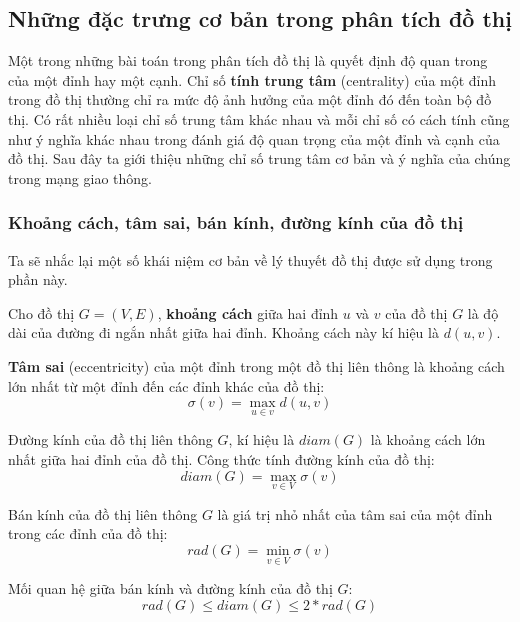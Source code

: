 \documentclass[14pt, oneside, a4paper, openany]{scrartcl}
\begin{document}
\subsection{Những đặc trưng cơ bản trong phân tích đồ thị}
Một trong những bài toán trong phân tích đồ thị là quyết định độ quan trong của một đỉnh hay một cạnh. Chỉ số \textbf{tính trung tâm}  (centrality) của một đỉnh trong đồ thị thường chỉ ra mức độ ảnh hưởng của một đỉnh đó đến toàn bộ đồ thị. Có rất nhiều loại chỉ số trung tâm khác nhau và mỗi chỉ số có cách tính cũng như ý nghĩa khác nhau trong đánh giá độ quan trọng của một đỉnh và cạnh của đồ thị. Sau đây ta giới thiệu những chỉ số trung tâm cơ bản và ý nghĩa của chúng trong mạng giao thông.

\subsubsection{Khoảng cách, tâm sai, bán kính, đường kính của đồ thị}
Ta sẽ nhắc lại một số khái niệm cơ bản về lý thuyết đồ thị được sử dụng trong phần này.

\cite{graphtextbook} Cho đồ thị $G=(V,E)$, \textbf{khoảng cách}  giữa hai đỉnh $u$ và $v$ của đồ thị $G$ là độ dài của đường đi ngắn nhất giữa hai đỉnh. Khoảng cách này kí hiệu là $d(u,v)$.

\cite{graphtextbook} \textbf{Tâm sai}  (eccentricity) của một đỉnh trong một đồ thị liên thông là khoảng cách lớn nhất từ một đỉnh đến các đỉnh khác của đồ thị:
\begin{equation}
	\sigma(v) = \max_{u \in v} d(u,v)
\end{equation}

\cite{graphtextbook} Đường kính của đồ thị liên thông $G$, kí hiệu là $diam(G)$ là khoảng cách lớn nhất giữa hai đỉnh của đồ thị. Công thức tính đường kính của đồ thị:
\begin{equation}
	diam(G) = \max_{v \in V} \sigma(v)
\end{equation}

\cite{graphtextbook} Bán kính của đồ thị liên thông $G$ là giá trị nhỏ nhất của tâm sai của một đỉnh trong các đỉnh của đồ thị:
\begin{equation}
	rad(G) = \min_{v \in V} \sigma(v)
\end{equation}

\cite{graphtextbook} Mối quan hệ giữa bán kính và đường kính của đồ thị $G$:
\begin{equation}
	rad(G) \leq diam(G) \leq 2 * rad(G)
\end{equation}
\end{document}
